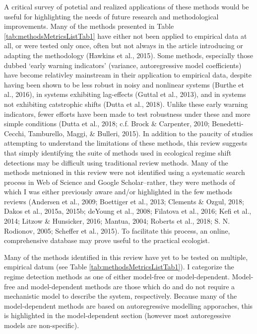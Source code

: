 \documentclass[12pt,twoside,openany]{reedthesis}
\begin{document}
A critical survey of potetial and realized applications of these methods would be useful for highlighting the needs of future research and methodological improvements. Many of the methods presented in Table \ref{tab:methodsMetricsListTab1} have either not been applied to empirical data at all, or were tested only once, often but not always in the article introducing or adapting the methodology (Hawkins et al., 2015). Some methods, especially those dubbed `early warning indicators' (variance, autoregressive model coefficients) have become relativley mainstream in their application to empirical data, despite having been shown to be less robust in noisy and nonlinear systems (Burthe et al., 2016), in systems exhibiting lag-effects (Guttal et al., 2013), and in systems not exhibiting catstrophic shifts (Dutta et al., 2018). Unlike these early warning indicators, fewer efforts have been made to test robustness under these and more simple conditions (Dutta et al., 2018; c.f. Brock \& Carpenter, 2010; Benedetti-Cecchi, Tamburello, Maggi, \& Bulleri, 2015). In addition to the paucity of studies attempting to understand the limitations of these methods, this review suggests that simply identifying the suite of methods used in ecological regime shift detections may be difficult using traditional review methods. Many of the methods metnioned in this review were not identified using a systematic search process in Web of Science and Google Scholar--rather, they were methods of which I was either previously aware and/or highlighted in the few methods reviews (Andersen et al., 2009; Boettiger et al., 2013; Clements \& Ozgul, 2018; Dakos et al., 2015a, 2015b; deYoung et al., 2008; Filatova et al., 2016; Kefi et al., 2014; Litzow \& Hunsicker, 2016; Mantua, 2004; Roberts et al., 2018; S. N. Rodionov, 2005; Scheffer et al., 2015). To facilitate this process, an online, comprehensive database may prove useful to the practical ecologist.

Many of the methods identified in this review have yet to be tested on multiple, empirical datum (see Table \ref{tab:methodsMetricsListTab1}). I categorize the regime detection methods as one of either model-free or model-dependent. Model-free and model-dependent methods are those which do and do not require a mechanistic model to describe the system, respectively. Because many of the model-dependent methods are based on autoregressive modelling apporaches, this is highlighted in the model-dependent section (however most autoregessive models are non-specific).
\end{document}
